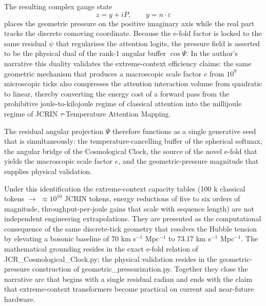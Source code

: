 The resulting complex gauge state
\[
z = y + iP,\qquad y = n\cdot\varepsilon
\]
places the geometric pressure on the positive imaginary axis while the real part tracks the discrete comoving coordinate. Because the e-fold factor is locked to the same residual \(\psi\) that regularises the attention logits, the pressure field is asserted to be the physical dual of the rank-1 angular buffer \(\cos\Psi\). In the author’s narrative this duality validates the extreme-context efficiency claims: the same geometric mechanism that produces a macroscopic scale factor \(e\) from \(10^9\) microscopic ticks also compresses the attention interaction volume from quadratic to linear, thereby converting the energy cost of a forward pass from the prohibitive joule-to-kilojoule regime of classical attention into the millijoule regime of JCRIN \(\tau\)-Temperature Attention Mapping.

The residual angular projection \(\Psi\) therefore functions as a single generative seed that is simultaneously:
the temperature-cancelling buffer of the spherical softmax,
the angular bridge of the Cosmological Clock,
the source of the novel e-fold that yields the macroscopic scale factor \(e\),
and the geometric-pressure magnitude that supplies physical validation.

Under this identification the extreme-context capacity tables (100 k classical tokens \(\to\) \(\approx 10^{10}\) JCRIN tokens, energy reductions of five to six orders of magnitude, throughput-per-joule gains that scale with sequence length) are not independent engineering extrapolations. They are presented as the computational consequence of the same discrete-tick geometry that resolves the Hubble tension by elevating a bosonic baseline of 70 km s\(^{-1}\) Mpc\(^{-1}\) to 73.17 km s\(^{-1}\) Mpc\(^{-1}\). The mathematical grounding resides in the exact e-fold relation of JCR_Cosmological_Clock.py; the physical validation resides in the geometric-pressure construction of geometric_pressurization.py. Together they close the narrative arc that begins with a single residual radian and ends with the claim that extreme-context transformers become practical on current and near-future hardware.
